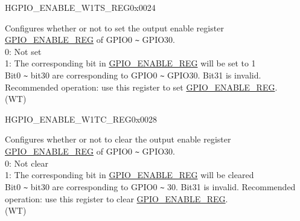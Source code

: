 \begin{register}{H}{GPIO\_ENABLE\_W1TS\_REG}{0x0024}\label{regdesc:GPIOENABLEW1TSREG}
%
\regnewline%
\begin{regdesc}\begin{reglist}
\label{fielddesc:GPIOENABLEW1TS}\item [GPIO\_ENABLE\_W1TS] Configures whether or not to set the output enable register \hyperref[regdesc:GPIOENABLEREG]{GPIO\_ENABLE\_REG} of GPIO0 \verb+~+ GPIO30.\\
0: Not set\\
1: The corresponding bit in \hyperref[regdesc:GPIOENABLEREG]{GPIO\_ENABLE\_REG} will be set to 1\\
Bit0 \verb+~+ bit30 are corresponding to GPIO0 \verb+~+ GPIO30. Bit31 is invalid. Recommended operation: use this register to set \hyperref[regdesc:GPIOENABLEREG]{GPIO\_ENABLE\_REG}.\\
(WT)
\end{reglist}\end{regdesc}
\end{register}


\begin{register}{H}{GPIO\_ENABLE\_W1TC\_REG}{0x0028}\label{regdesc:GPIOENABLEW1TCREG}
%
\regnewline%
\begin{regdesc}\begin{reglist}
\label{fielddesc:GPIOENABLEW1TC}\item [GPIO\_ENABLE\_W1TC] Configures whether or not to clear the output enable register \hyperref[regdesc:GPIOENABLEREG]{GPIO\_ENABLE\_REG} of GPIO0 \verb+~+ GPIO30. \\
0: Not clear\\
1: The corresponding bit in \hyperref[regdesc:GPIOENABLEREG]{GPIO\_ENABLE\_REG} will be cleared\\
Bit0 \verb+~+ bit30 are corresponding to GPIO0 \verb+~+ 30. Bit31 is invalid. Recommended operation: use this register to clear \hyperref[regdesc:GPIOENABLEREG]{GPIO\_ENABLE\_REG}.\\
(WT)
\end{reglist}\end{regdesc}
\end{register}


